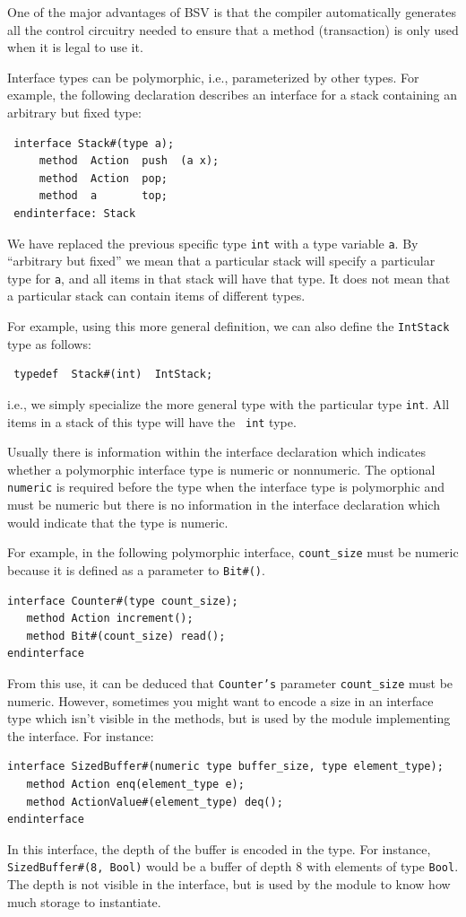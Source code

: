 \documentclass[twoside,letterpaper]{article}
\newcommand{\BSV}{BSV}
\newcommand{\te}[1]{\texttt{#1}}
\begin{document}
One of the major advantages of {\BSV} is that the compiler
automatically generates all the control circuitry needed to ensure
that a method (transaction) is only used when it is legal to use it.

Interface types can be polymorphic, i.e., parameterized by other
types.  For example, the following declaration describes an interface
for a stack containing an arbitrary but fixed type:
\begin{verbatim}
 interface Stack#(type a);
     method  Action  push  (a x);
     method  Action  pop;
     method  a       top;
 endinterface: Stack
\end{verbatim}
We have replaced the previous specific type \texttt{int} with a type
variable \texttt{a}.  By ``arbitrary but fixed'' we mean that a
particular stack will specify a particular type for \texttt{a}, and all
items in that stack will have that type.  It does not mean that a
particular stack can contain items of different types.

For example, using this more general definition, we can also define
the \texttt{IntStack} type as follows:
\begin{verbatim}
 typedef  Stack#(int)  IntStack;
\end{verbatim}
i.e., we simply specialize the more general type with the particular
type \texttt{int}.  All items in a stack of this type will have the {\tt
int} type.

Usually there is information within the interface declaration which
indicates whether a polymorphic interface type is numeric or
nonnumeric.  The optional \te{numeric} is required before the type when the
interface type is polymorphic and must be numeric but there is no
information in the interface declaration which would indicate that the
type is numeric.

For example, in the following polymorphic interface, \te{count\_size}
must be numeric because it is defined as a parameter to \te{Bit\#()}.
\begin{verbatim}
interface Counter#(type count_size);
   method Action increment();
   method Bit#(count_size) read();
endinterface
\end{verbatim}
From this use, it can be deduced that
\te{Counter's} parameter \te{count\_size} must be numeric.  However, sometimes
you might want to encode a size in an interface type which isn't
visible in the methods, but is used by the module implementing the
interface.   For instance:
\begin{verbatim}
interface SizedBuffer#(numeric type buffer_size, type element_type);
   method Action enq(element_type e);
   method ActionValue#(element_type) deq();
endinterface
\end{verbatim}
In this interface, the depth of the buffer is encoded in the type.
For instance, \te{SizedBuffer\#(8, Bool)} would be a buffer of depth 8 with
elements of type \te{Bool}.  The depth is not visible in the interface, but
is used by the module to know how much storage to instantiate.
\end{document}
